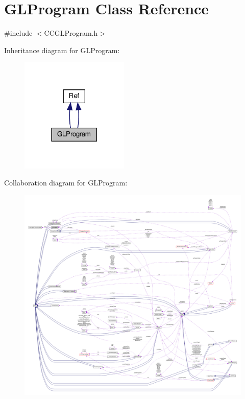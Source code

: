 \hypertarget{classGLProgram}{}\section{G\+L\+Program Class Reference}
\label{classGLProgram}


{\ttfamily \#include $<$C\+C\+G\+L\+Program.\+h$>$}



Inheritance diagram for G\+L\+Program\+:
\nopagebreak
\begin{figure}[H]
\begin{center}
\leavevmode
\includegraphics[width=146pt]{classGLProgram__inherit__graph}
\end{center}
\end{figure}


Collaboration diagram for G\+L\+Program\+:
\nopagebreak
\begin{figure}[H]
\begin{center}
\leavevmode
\includegraphics[width=350pt]{classGLProgram__coll__graph}
\end{center}
\end{figure}
